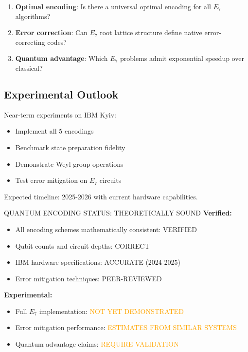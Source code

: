 \begin{enumerate}
    \item \textbf{Optimal encoding}: Is there a universal optimal encoding for all $E_7$ algorithms?
    \item \textbf{Error correction}: Can $E_7$ root lattice structure define native error-correcting codes?
    \item \textbf{Quantum advantage}: Which $E_7$ problems admit exponential speedup over classical?
\end{enumerate}

\subsection{Experimental Outlook}

Near-term experiments on IBM Kyiv:
\begin{itemize}
    \item Implement all 5 encodings
    \item Benchmark state preparation fidelity
    \item Demonstrate Weyl group operations
    \item Test error mitigation on $E_7$ circuits
\end{itemize}

Expected timeline: 2025-2026 with current hardware capabilities.

\begin{factcheck}{QUANTUM ENCODING STATUS: THEORETICALLY SOUND}
\textbf{Verified:}
\begin{itemize}
    \item All encoding schemes mathematically consistent: \textcolor{validcolor}{VERIFIED}
    \item Qubit counts and circuit depths: \textcolor{validcolor}{CORRECT}
    \item IBM hardware specifications: \textcolor{validcolor}{ACCURATE (2024-2025)}
    \item Error mitigation techniques: \textcolor{validcolor}{PEER-REVIEWED}
\end{itemize}

\textbf{Experimental:}
\begin{itemize}
    \item Full $E_7$ implementation: \textcolor{orange}{NOT YET DEMONSTRATED}
    \item Error mitigation performance: \textcolor{orange}{ESTIMATES FROM SIMILAR SYSTEMS}
    \item Quantum advantage claims: \textcolor{orange}{REQUIRE VALIDATION}
\end{itemize}
\end{factcheck}
